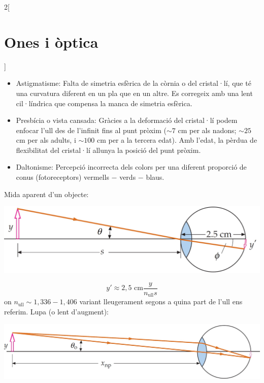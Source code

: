 \documentclass[class=article,10pt,crop=false]{standalone}
\begin{document}
\begin{multicols}{2}[\section{Ones i òptica}]
\begin{itemize}
\begin{minipage}{\linewidth}
    \end{minipage}
    \item Astigmatisme: Falta de simetria es\-fè\-ri\-ca de la còrnia o del cristal·lí, que té una curvatura diferent en un pla que en un altre. Es corregeix amb una lent cil·líndrica que compensa la manca de simetria esfèrica.
    \item Presbícia o vista cansada: Gràcies a la deformació del cristal·lí podem enfocar l'ull des de l'infinit fins al punt pròxim ($\sim7$ cm per als nadons; $\sim25$ cm per als adults, i $\sim100$ cm per a la tercera edat). Amb l'edat, la pèrdua de fle\-xi\-bi\-li\-tat del cristal·lí allunya la posició del punt pròxim.
    \item Daltonisme: Percepció incorrecta dels co\-lors per una diferent proporció de conus (fotoreceptors) vermells $-$ verds $-$ blaus.
\end{itemize}
Mida aparent d'un objecte:\newline
\begin{minipage}{\linewidth}
    \centering
    \includegraphics[width=\linewidth]{Physics/1st/Waves_and_optics/Images/mida.jpg} 
\end{minipage} $$y'\approx2,5\text{ cm}\frac{y}{n_{\text{ull}}s}$$ {\footnotesize on $n_{\text{ull}}\sim1,336-1,406$ variant lleugerament segons a quina part de l'ull ens referim.}\newline
Lupa (o lent d'augment):\newline
\begin{minipage}{\linewidth}
    \includegraphics[width=\linewidth]{Physics/1st/Waves_and_optics/Images/senselup.jpg} 

\end{minipage}
\end{multicols}
\end{document}
